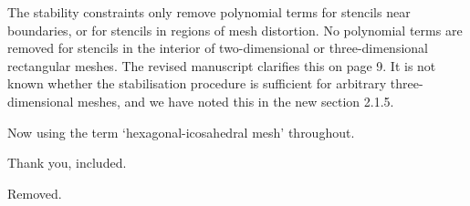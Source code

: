\documentclass[times]{elsarticle}
\begin{document}
\begin{quotation}
\begin{comment}
\item  Appendix A, p.22: How restrictive is the 1D stability analysis
    for the multidimensional domains? May this become a more
    serious issue in 3D configurations?
\end{comment}
\end{quotation}
The stability constraints only remove polynomial terms for stencils near boundaries, or for stencils in regions of mesh distortion.  No polynomial terms are removed for stencils in the interior of two-dimensional or three-dimensional rectangular meshes.  The revised manuscript clarifies this on page 9.
It is not known whether the stabilisation procedure is sufficient for arbitrary three-dimensional meshes, and we have noted this in the new section 2.1.5.


\begin{quotation}
\begin{comment}
\item  In various places throughout the paper "icosahedra" is used
    instead of "icosadedral". I suggest the latter should be used
    consistently throughout the paper.
\end{comment}
\end{quotation}
Now using the term `hexagonal-icosahedral mesh' throughout.

\begin{quotation}
\begin{comment}
\item  p.3, end of first paragraph: I suggest to mention here a
    recent advancement of the finite-volume MPDATA (Kühnlein and
    Smolarkiewicz, J. Comput. Phys. 2017,
    \url{http://dx.doi.org/10.1016/j.jcp.2016.12.054}). Among others, this
    paper demonstrates applicability of MPDATA for 3D compressible
    atmospheric dynamics on arbitrary hybrid unstructured meshes.
\end{comment}
\end{quotation}
Thank you, included.

\begin{quotation}
\begin{comment}
\item  p.3, paragraph after Eq. (2b): if there is no specific need, I
    sugggest to remove "zero-dimensional".
\end{comment}
\end{quotation}
Removed.
\end{document}
